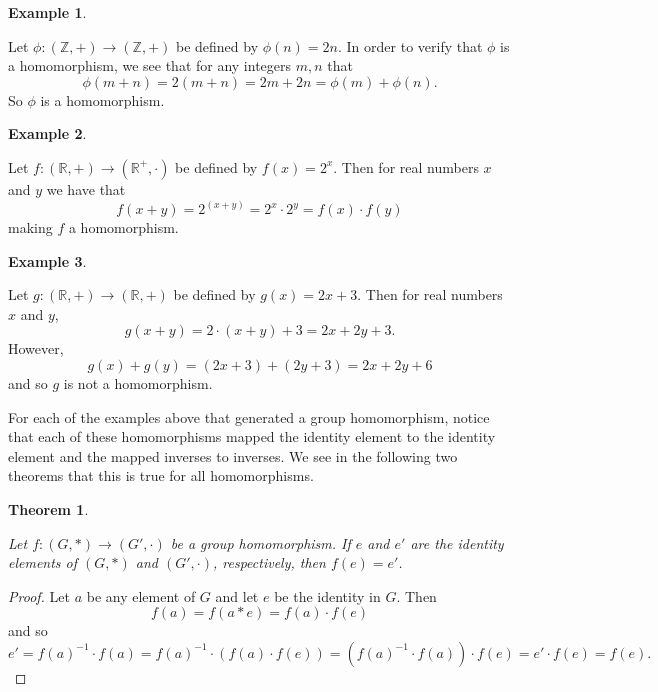 \documentclass[
]{book}
\newtheorem{theorem}{Theorem}[chapter]
\theoremstyle{definition}
\theoremstyle{definition}
\newtheorem{example}{Example}[chapter]
\theoremstyle{definition}
\theoremstyle{definition}
\theoremstyle{remark}
\begin{document}
\begin{example}
\protect\hypertarget{exm:unlabeled-div-82}{}\label{exm:unlabeled-div-82}

Let \(\phi: (\mathbb{Z},+) \rightarrow (\mathbb{Z},+)\) be defined by \(\phi(n)=2n\). In order to verify that \(\phi\) is a homomorphism, we see that for any integers \(m,n\) that \[\phi(m+n)= 2(m+n) = 2m + 2n = \phi(m)+\phi(n).\] So \(\phi\) is a homomorphism.

\end{example}

\begin{example}
\protect\hypertarget{exm:unlabeled-div-83}{}\label{exm:unlabeled-div-83}

Let \(f: (\mathbb{R}, +) \rightarrow (\mathbb{R}^+, \cdot)\) be defined by \(f(x)=2^x\). Then for real numbers \(x\) and \(y\) we have that \[f(x+y)=2^{(x+y)} = 2^x \cdot 2^y = f(x) \cdot f(y)\] making \(f\) a homomorphism.

\end{example}

\begin{example}
\protect\hypertarget{exm:unlabeled-div-84}{}\label{exm:unlabeled-div-84}

Let \(g: (\mathbb{R}, +) \rightarrow (\mathbb{R},+)\) be defined by \(g(x)=2x+3\). Then for real numbers \(x\) and \(y\), \[g(x+y) = 2\cdot (x+y)+3=2x+2y+3.\] However, \[g(x)+g(y)=(2x+3)+(2y+3)= 2x+2y+6\] and so \(g\) is not a homomorphism.

\end{example}

For each of the examples above that generated a group homomorphism, notice that each of these homomorphisms mapped the identity element to the identity element and the mapped inverses to inverses. We see in the following two theorems that this is true for all homomorphisms.

\begin{theorem}
\protect\hypertarget{thm:homomorphism-identity}{}\label{thm:homomorphism-identity}

Let \(f:(G,*)\rightarrow (G',\cdot)\) be a group homomorphism. If \(e\) and \(e'\) are the identity elements of \((G,*)\) and \((G',\cdot)\), respectively, then \(f(e)=e'\).

\end{theorem}

\begin{proof}

Let \(a\) be any element of \(G\) and let \(e\) be the identity in \(G\). Then
\[f(a) = f(a*e) = f(a) \cdot f(e)\] and so \[e' = f(a)^{-1}\cdot f(a) = f(a)^{-1}\cdot ( f(a) \cdot f(e) ) = (f(a)^{-1} \cdot f(a))\cdot f(e) = e' \cdot f(e) = f(e).\]

\end{proof}
\end{document}
